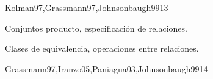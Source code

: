 \begin{syllabus}
\begin{outcomes}
\end{outcomes}

\begin{unit}{\DSONEDef}{Kolman97,Grassmann97,Johnsonbaugh99}{13}
\begin{topics}
	\item  \DSONETopicFunciones
	\item  Conjuntos producto, especificación de relaciones.
	\item  \DSONETopicRelaciones
	\item  Clases de equivalencia, operaciones entre relaciones.
	\item  \DSONETopicConjuntos
	\item  \DSONETopicPrincipio
	\item  \DSONETopicCardinalidad
\end{topics}

\begin{unitgoals}
	\item \DSONEObjONE
	\item \DSONEObjTWO
	\item \DSONEObjTHREE
	\item \DSONEObjFOUR
\end{unitgoals}
\end{unit}

\begin{unit}{\DSTWODef}{Grassmann97,Iranzo05,Paniagua03,Johnsonbaugh99}{14}
\begin{topics}
         \item \DSTWOTopicLogica
         \item \DSTWOTopicConectivos
         \item \DSTWOTopicTablas
         \item \DSTWOTopicFormas
         \item \DSTWOTopicValidacion
         \item \DSTWOTopicLogicade
     \item \DSTWOTopicCuantificacion
         \item \DSTWOTopicModus
         \item \DSTWOTopicLimitaciones
   \end{topics}

   \begin{unitgoals}
      \item \DSTWOObjONE
         \item \DSTWOObjTWO
         \item \DSTWOObjTHREE
         \item \DSTWOObjFOUR
   \end{unitgoals}
\end{unit}


\end{syllabus}
